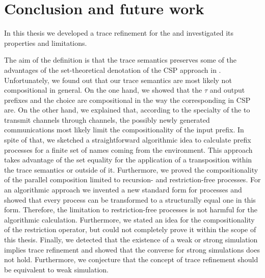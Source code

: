 \chapter{Conclusion and future work}
\label{sec_conclusion}
In this thesis we developed a trace refinement for the \picalc{} and investigated its properties and limitations.

The aim of the definition is that the trace semantics preserves some of the advantages of the set-theoretical denotation of the \gls{CSP} approach in \cite{roscoe}. Unfortunately, we found out that our trace semantics are most likely not compositional in general. On the one hand, we showed that the $\tau$ and output prefixes and the choice are compositional in the way the corresponding in \gls{CSP} are. On the other hand, we explained that, according to the specialty of the \picalc{} to transmit channels through channels, the possibly newly generated communications most likely limit the compositionality of the input prefix. In spite of that, we sketched a straightforward algorithmic idea to calculate prefix processes for a finite set of names coming from the environment. This approach takes advantage of the set equality for the application of a transposition within the trace semantics or outside of it. Furthermore, we proved the compositionality of the parallel composition limited to recursion- and restriction-free processes. For an algorithmic approach we invented a new standard form for processes and showed that every process can be transformed to a structurally equal one in this form. Therefore, the limitation to restriction-free processes is not harmful for the algorithmic calculation. Furthermore, we stated an idea for the compositionality of the restriction operator, but could not completely prove it within the scope of this thesis. Finally, we detected that the existence of a weak or strong simulation implies trace refinement and showed that the converse for strong simulations does not hold. Furthermore, we conjecture that the concept of trace refinement should be equivalent to weak simulation.

%

